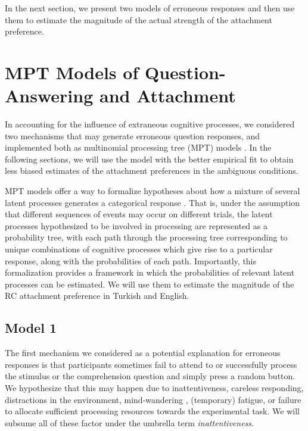 \documentclass[11pt]{article}\usepackage[]{graphicx}\usepackage[]{color}
\begin{document}
In the next section, we present two models of erroneous responses and then use them to estimate the magnitude of the actual strength of the attachment preference.


\section{MPT Models of Question-Answering and Attachment}

In accounting for the influence of extraneous cognitive processes, we considered two mechanisms that may generate erroneous question responses, and implemented both as multinomial processing tree (MPT) models \citep{BatchelderRiefer:1999}. In the following sections, we will use the model with the better empirical fit to obtain less biased estimates of the attachment preferences in the ambiguous conditions. 

MPT models offer a way to formalize hypotheses about how a mixture of several latent processes generates a categorical response 
\citep[cf.][ for an overview]{ErdfelderEtAl:2009}. 
That is, under the assumption that different sequences of events may occur on different trials, 
the latent processes hypothesized to be involved in processing are represented as a probability tree, with each path through the processing tree corresponding to unique combinations of cognitive processes which give rise to a particular response, along with the probabilities of each path.
Importantly, this formalization provides a framework in which the probabilities of relevant latent processes can be estimated. We will use them to estimate the magnitude of the RC attachment preference in Turkish and English.






\subsection{Model 1}


The first mechanism we considered as a potential explanation for erroneous responses is that participants sometimes fail to attend to or successfully process the stimulus or the comprehension question and simply press a random button. We hypothesize that this may happen due to inattentiveness, careless responding,
distractions in the environment, mind-wandering \citep[e.g.,][]{Smallwood:2011}, (temporary) fatigue, or
failure to allocate sufficient processing resources towards the experimental task. We will subsume all of these factor under the umbrella term \textit{inattentiveness}.
\end{document}
